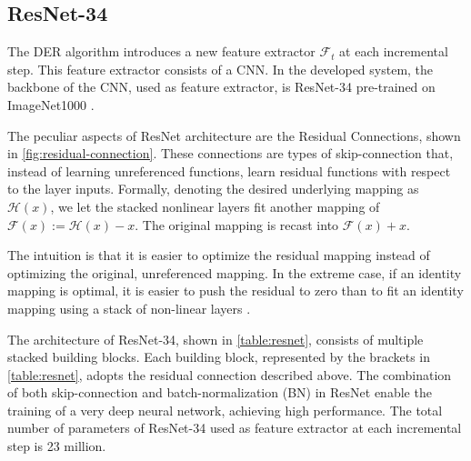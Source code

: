 \subsection{ResNet-34}
\label{sec:resnet}
The DER algorithm introduces a new feature extractor $\mathcal{F}_t$ at each incremental step. This feature extractor consists of a CNN. In the developed system, the backbone of the CNN, used as feature extractor, is ResNet-34 \cite{he2016deep} pre-trained on ImageNet1000 \cite{deng2009imagenet}.

The peculiar aspects of ResNet architecture are the Residual Connections, shown in \autoref{fig:residual-connection}.
These connections are types of skip-connection that, instead of learning unreferenced functions, learn residual functions with respect to the layer inputs.
Formally, denoting the desired underlying mapping as $\mathcal{H}(x)$, we let the stacked nonlinear layers fit another mapping of $\mathcal{F}(x) := \mathcal{H}(x) - x$. The original mapping is recast into $\mathcal{F}(x) + x$.

The intuition is that it is easier to optimize the residual mapping instead of optimizing the original, unreferenced mapping. In the extreme case, if an identity mapping is optimal, it is easier to push the residual to zero than to fit an identity mapping using a stack of non-linear layers \cite{he2016deep}.

The architecture of ResNet-34, shown in \autoref{table:resnet}, consists of multiple stacked building blocks. Each building block, represented by the brackets in \autoref{table:resnet}, adopts the residual connection described above.
The combination of both skip-connection and batch-normalization (BN) \cite{ioffe2015batch} in ResNet enable the training of a very deep neural network, achieving high performance.
The total number of parameters of ResNet-34 used as feature extractor at each incremental step is 23 million.

